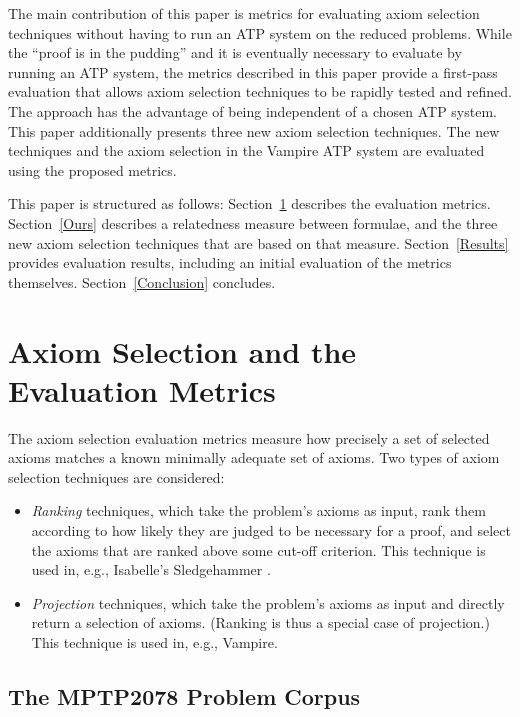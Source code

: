 \documentclass[]{ceurart}
\begin{document}
The main contribution of this paper is metrics for evaluating axiom selection 
techniques without having to run an ATP system on the reduced problems.
While the ``proof is in the pudding'' and it is eventually necessary to
evaluate by running an ATP system, the metrics described in this paper
provide a first-pass evaluation that allows axiom selection techniques to
be rapidly tested and refined.
The approach has the advantage of being independent of a chosen ATP system.
This paper additionally presents three new axiom selection techniques. 
The new techniques and the axiom selection \cite{HV11} in the Vampire 
\cite{KV13} 
ATP system are evaluated using the proposed metrics.

This paper is structured as follows:
Section~\ref{Metrics} describes the evaluation metrics.
Section~\ref{Ours} describes a relatedness measure between formulae, and
the three new axiom selection techniques that are based on that measure.
Section~\ref{Results} provides evaluation results, including an initial 
evaluation of the metrics themselves.
Section~\ref{Conclusion} concludes.

\section{Axiom Selection and the Evaluation Metrics}
\label{Metrics}

The axiom selection evaluation metrics measure how precisely a set of
selected axioms matches a known minimally adequate set of axioms.
Two types of axiom selection techniques are considered:
\begin{itemize}
\item \emph{Ranking} techniques, which take the problem's axioms as input, 
      rank them according to how likely they are judged to be necessary for 
      a proof, and select the axioms that are ranked above some cut-off
      criterion.
      This technique is used in, e.g., Isabelle's Sledgehammer \cite{PB10}.
\item \emph{Projection} techniques, which take the problem's axioms as input 
      and directly return a selection of axioms.
      (Ranking is thus a special case of projection.)
      This technique is used in, e.g., Vampire.
\end{itemize}

\subsection{The MPTP2078 Problem Corpus}
\label{MPTP2078}
\end{document}
